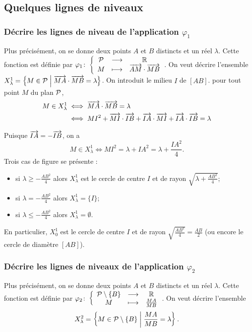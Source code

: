 \subsection{Quelques lignes de niveaux}
\subsubsection{Décrire les lignes de niveau de l'application \(\varphi_1\)}

Plus précisément, on se  donne deux points \(A\) et \(B\) distincts et un réel 
\(\lambda\). Cette fonction est définie par 
\(\fonction{\varphi_1}{\P}{\R}{M}{\vect{AM} \cdot \vect{MB}}\). On veut décrire 
l'ensemble \(X_{\lambda}^{1} = \enstq{M \in \P}{\vect{MA} \cdot \vect{MB} = 
\lambda}\). On introduit le milieu \(I\) de \([AB]\). pour tout point \(M\) du 
plan \(\P\),
\begin{align}
    M \in X_{\lambda}^{1} & \iff \vect{MA} \cdot \vect{MB} = \lambda \\ & \iff 
    MI^2 + \vect{MI} \cdot \vect{IB} + \vect{IA} \cdot \vect{MI} + \vect{IA} 
    \cdot \vect{IB} = \lambda
\end{align}

Puisque \(\vect{IA} = -\vect{IB}\), on a \begin{equation}
    M \in X_{\lambda}^{1}  \iff MI^2 = \lambda + IA^2 = \lambda + 
    \frac{IA^2}{4}.
\end{equation}
Trois cas de figure se présente :
\begin{itemize}
    \item si \(\lambda \geqslant -\frac{AB^2}{4}\) alors \(X_{\lambda}^{1}\) est 
        le cercle de centre \(I\) et de rayon \(\sqrt{\lambda 
        +\frac{AB^2}{4}}\);
    \item si \(\lambda = -\frac{AB^2}{4}\) alors \(X_{\lambda}^{1} = \{I\}\);
    \item si \(\lambda \leqslant -\frac{AB^2}{4}\) alors \(X_{\lambda}^{1} = 
        \emptyset\).
\end{itemize}
En particulier, \(X_{0}^{1}\) est le cercle de centre \(I\) et de rayon 
\(\sqrt{\frac{AB^2}{4}} = \frac{AB}{2}\) (ou encore le cercle de diamètre 
\([AB]\)).

\subsubsection{Décrire les lignes de niveaux de l'application \(\varphi_2\)}

Plus précisément, on se donne deux points \(A\) et \(B\) distincts et un réel 
\(\lambda\). Cette fonction est définie par 
\(\fonction{\varphi_2}{\P\setminus\{B\}}{\R}{M}{\frac{MA}{MB}}\). On veut 
décrire l'ensemble
\begin{equation}
    X_{\lambda}^2 = \enstq{M \in \P\setminus\{B\}}{\frac{MA}{MB} = \lambda}.  
\end{equation}

